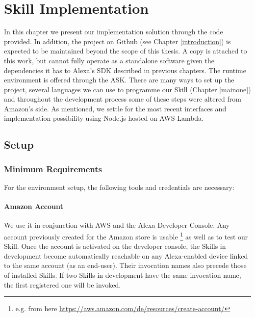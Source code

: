 \chapter{Skill Implementation}%
\label{maintwo}

In this chapter we present our implementation solution through the code provided. %
In addition, the project on Github (see Chapter \ref{introduction}) is expected to be maintained %
beyond the scope of this thesis. A copy is attached to this work, but cannot fully operate as a standalone software given the dependencies it has to Alexa's SDK described in previous chapters. The runtime environment is offered through the ASK. %
There are many ways to %
set up the project, several languages we can use to programme 
our Skill (Chapter \ref{mainone}) and throughout the development process some of these steps were altered from Amazon's side. %
As mentioned, we settle for the most recent interfaces and implementation possibility using Node.js hosted on AWS Lambda. %

\section{Setup}



\subsection*{Minimum Requirements}
For the environment setup, the following tools and credentials are necessary:

\subsubsection*{Amazon Account}
We use it in conjunction with AWS and the Alexa Developer Console. Any account previously created for the Amazon store is usable \footnote{e.g. from here  \url{https://aws.amazon.com/de/resources/create-account/}} as well as to test our Skill. Once the account is activated on the developer console, the Skills in development become automatically reachable on any Alexa-enabled device linked to the same account (as an end-user). Their invocation names also precede those of installed Skills. If two Skills in development have the same invocation name, the first registered one will be invoked.
	
